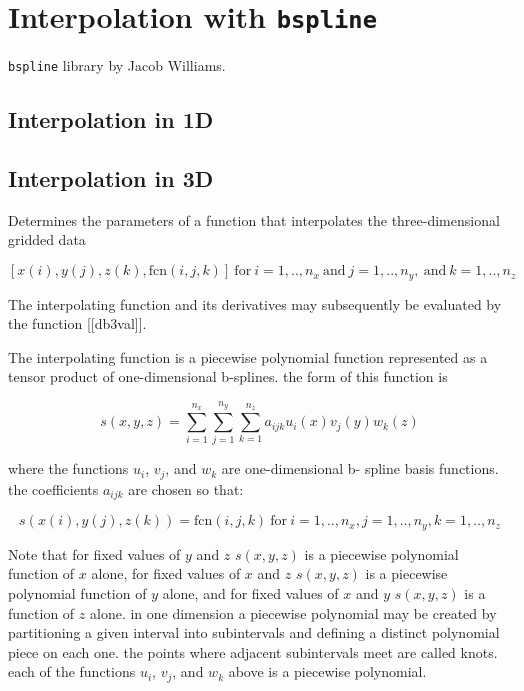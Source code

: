 \chapter{Interpolation with \texttt{bspline}}

\texttt{bspline} library by Jacob Williams.

\section{Interpolation in 1D}


\section{Interpolation in 3D}

Determines the parameters of a function that interpolates
the three-dimensional gridded data

$$ [x(i),y(j),z(k),\mathrm{fcn}(i,j,k)] ~\mathrm{for}~
   i=1,..,n_x ~\mathrm{and}~ j=1,..,n_y, ~\mathrm{and}~ k=1,..,n_z $$

The interpolating function and
its derivatives may subsequently be evaluated by the function
[[db3val]].

The interpolating function is a piecewise polynomial function
represented as a tensor product of one-dimensional b-splines. the
form of this function is

$$ s(x,y,z) = \sum_{i=1}^{n_x} \sum_{j=1}^{n_y} \sum_{k=1}^{n_z}
              a_{ijk} u_i(x) v_j(y) w_k(z) $$

where the functions \(u_i\), \(v_j\), and \(w_k\) are one-dimensional b-
spline basis functions. the coefficients \(a_{ijk}\) are chosen so that:

$$ s(x(i),y(j),z(k)) = \mathrm{fcn}(i,j,k)
   ~\mathrm{for}~ i=1,..,n_x , j=1,..,n_y , k=1,..,n_z $$

Note that for fixed values of \(y\) and \(z\) \(s(x,y,z)\) is a piecewise
polynomial function of \(x\) alone, for fixed values of \(x\) and \(z\) \(s(x,y,z)\)
is a piecewise polynomial function of \(y\) alone, and for fixed
values of \(x\) and \(y\) \(s(x,y,z)\) is a function of \(z\) alone. in one
dimension a piecewise polynomial may be created by partitioning a
given interval into subintervals and defining a distinct polynomial
piece on each one. the points where adjacent subintervals meet are
called knots. each of the functions \(u_i\), \(v_j\), and \(w_k\) above is a
piecewise polynomial.


